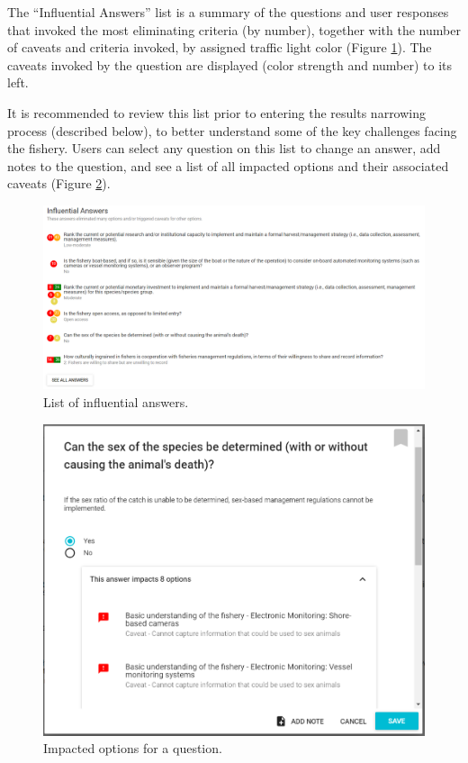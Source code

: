 \documentclass[
  11pt,
]{book}
\begin{document}
The ``Influential Answers'' list is a summary of the questions and user responses that invoked the most eliminating criteria (by number), together with the number of caveats and criteria invoked, by assigned traffic light color (Figure \ref{fig:influential-answers}). The caveats invoked by the question are displayed (color strength and number) to its left.

It is recommended to review this list prior to entering the results narrowing process (described below), to better understand some of the key challenges facing the fishery. Users can select any question on this list to change an answer, add notes to the question, and see a list of all impacted options and their associated caveats (Figure \ref{fig:influential-answers-expanded}).

\begin{figure}

{\centering \includegraphics[width=0.95\linewidth]{images/influential-answers} 

}

\caption{List of influential answers.}\label{fig:influential-answers}
\end{figure}

\begin{figure}

{\centering \includegraphics[width=0.75\linewidth]{images/influential-answers-expanded} 

}

\caption{Impacted options for a question.}\label{fig:influential-answers-expanded}
\end{figure}
\end{document}
